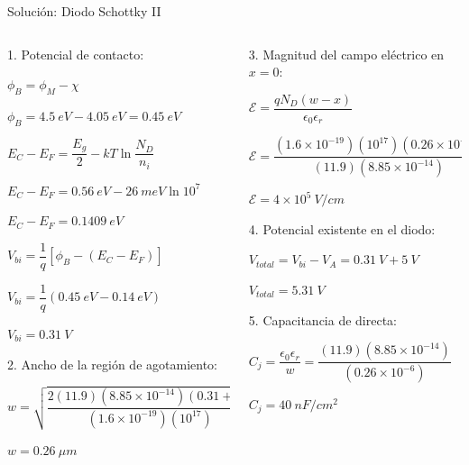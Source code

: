 \documentclass[10pt,t,aspectratio=169]{beamer}
\begin{document}
\begin{frame}{Solución: Diodo Schottky II}

\begin{columns}

\begin{column}{0.5\textwidth}

1. Potencial de contacto:

$\phi_B = \phi_M - \chi$

$\phi_B = 4.5\ eV - 4.05\ eV = 0.45\ eV$

$ E_C - E_F = \dfrac{E_g}{2} - kT \ln \dfrac{N_D}{n_i} $

$ E_C - E_F = 0.56\ eV - 26\ meV \ln 10^{7} $

$ E_C - E_F = 0.1409\ eV $

$ V_{bi} = \dfrac{1}{q} \left[ \phi_B - (E_C - E_F) \right] $

$ V_{bi} = \dfrac{1}{q} (0.45\ eV - 0.14\ eV) $

$ V_{bi} = 0.31\ V $

\vspace{3mm}
2. Ancho de la región de agotamiento:

$ w = \sqrt{\dfrac{2(11.9)(8.85\times{}10^{-14})(0.31 + 5)}{(1.6\times{}10^{-19})(10^{17})}} $

$ w = 0.26\ \mu m$

\end{column}

\begin{column}{0.5\textwidth}

3. Magnitud del campo eléctrico en $x=0$:

$ \mathcal{E} = \dfrac{q N_D (w-x)}{\epsilon_0 \epsilon_r} $

$ \mathcal{E} = \dfrac{(1.6\times{}10^{-19}) (10^{17}) (0.26\times{}10^{-6})}{(11.9)(8.85\times{}10^{-14})} $

$ \mathcal{E} = 4\times{}10^{5}\ V/cm $

\vspace{3mm}
4. Potencial existente en el diodo:

$ V_{total} = V_{bi} - V_A = 0.31\ V + 5\ V $

$ V_{total} = 5.31\ V $

\vspace{3mm}
5. Capacitancia de directa:

$C_j = \dfrac{\epsilon_0 \epsilon_r}{w} = \dfrac{(11.9)(8.85\times{}10^{-14})}{(0.26\times{}10^{-6})}$

$C_j = 40\ nF/cm^{2}$

\end{column}

\end{columns}
    
\end{frame}
\end{document}

